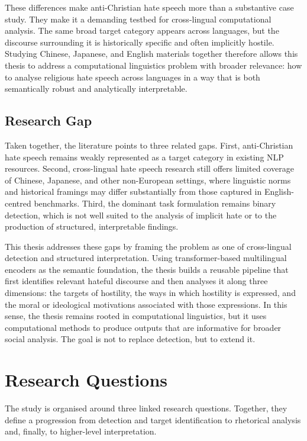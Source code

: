 \documentclass[../CLthesis.tex]{subfiles}
\begin{document}
These differences make anti-Christian hate speech more than a substantive case study. They make it a demanding testbed for cross-lingual computational analysis. The same broad target category appears across languages, but the discourse surrounding it is historically specific and often implicitly hostile. Studying Chinese, Japanese, and English materials together therefore allows this thesis to address a computational linguistics problem with broader relevance: how to analyse religious hate speech across languages in a way that is both semantically robust and analytically interpretable.

\subsection{Research Gap}

Taken together, the literature points to three related gaps. First, anti-Christian hate speech remains weakly represented as a target category in existing NLP resources. Second, cross-lingual hate speech research still offers limited coverage of Chinese, Japanese, and other non-European settings, where linguistic norms and historical framings may differ substantially from those captured in English-centred benchmarks. Third, the dominant task formulation remains binary detection, which is not well suited to the analysis of implicit hate or to the production of structured, interpretable findings.

This thesis addresses these gaps by framing the problem as one of cross-lingual detection and structured interpretation. Using transformer-based multilingual encoders as the semantic foundation, the thesis builds a reusable pipeline that first identifies relevant hateful discourse and then analyses it along three dimensions: the targets of hostility, the ways in which hostility is expressed, and the moral or ideological motivations associated with those expressions. In this sense, the thesis remains rooted in computational linguistics, but it uses computational methods to produce outputs that are informative for broader social analysis. The goal is not to replace detection, but to extend it.

\section{Research Questions}

The study is organised around three linked research questions. Together, they define a progression from detection and target identification to rhetorical analysis and, finally, to higher-level interpretation.
\end{document}
